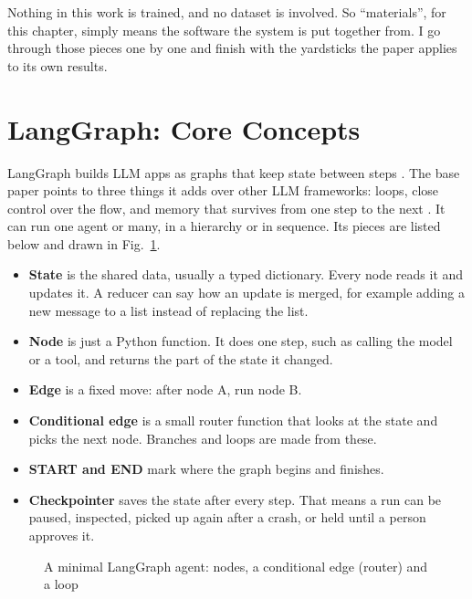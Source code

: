 \documentclass[12pt,a4paper]{report}
\begin{document}
Nothing in this work is trained, and no dataset is involved. So ``materials'', for this chapter, simply means the software the system is put together from. I go through those pieces one by one and finish with the yardsticks the paper applies to its own results.

\section{LangGraph: Core Concepts}

LangGraph builds LLM apps as graphs that keep state between steps \cite{langgraphdocs}. The base paper points to three things it adds over other LLM frameworks: loops, close control over the flow, and memory that survives from one step to the next \cite{duan2024langgraphcrewai}. It can run one agent or many, in a hierarchy or in sequence. Its pieces are listed below and drawn in Fig.~\ref{fig:graph}.

\begin{itemize}
    \item \textbf{State} is the shared data, usually a typed dictionary. Every node reads it and updates it. A reducer can say how an update is merged, for example adding a new message to a list instead of replacing the list.
    \item \textbf{Node} is just a Python function. It does one step, such as calling the model or a tool, and returns the part of the state it changed.
    \item \textbf{Edge} is a fixed move: after node A, run node B.
    \item \textbf{Conditional edge} is a small router function that looks at the state and picks the next node. Branches and loops are made from these.
    \item \textbf{START and END} mark where the graph begins and finishes.
    \item \textbf{Checkpointer} saves the state after every step. That means a run can be paused, inspected, picked up again after a crash, or held until a person approves it.
\end{itemize}

\begin{figure}[H]
\centering
{}
\caption{A minimal LangGraph agent: nodes, a conditional edge (router) and a loop}
\label{fig:graph}
\end{figure}
\end{document}
